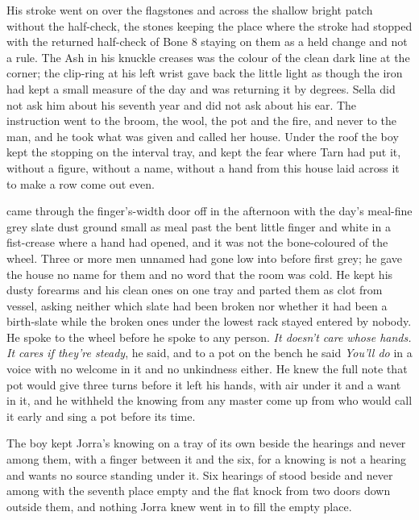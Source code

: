 His stroke went on over the flagstones and across the shallow bright patch without the half-check, the stones keeping the place where the stroke had stopped with the returned half-check of Bone 8 staying on them as a held change and not a rule. The Ash in his knuckle creases was the colour of the clean dark line at the corner; the clip-ring at his left wrist gave back the little light as though the iron had kept a small measure of the day and was returning it by degrees. Sella did not ask him about his seventh year and did not ask about his ear. The instruction went to the broom, the wool, the pot and the fire, and never to the man, and he took what was given and called her house. Under the roof the boy kept the stopping on the interval tray, and kept the fear where Tarn had put it, without a figure, without a name, without a hand from this house laid across it to make a row come out even.

\scenebreak

 came through the finger's-width door off  in the afternoon with the day's meal-fine grey slate dust ground small as meal past the bent little finger and white in a fist-crease where a hand had opened, and it was not the bone-coloured  of the wheel. Three or more men unnamed had gone low into  before first grey; he gave the house no name for them and no word that the room was cold. He kept his dusty forearms and his clean ones on one tray and parted them as clot from vessel, asking neither which slate had been broken nor whether it had been a birth-slate while the broken ones under the lowest rack stayed entered by nobody. He spoke to the wheel before he spoke to any person. \emph{It doesn't care whose hands. It cares if they're steady}, he said, and to a pot on the bench he said \emph{You'll do} in a voice with no welcome in it and no unkindness either. He knew the full note that pot would give three turns before it left his hands, with air under it and a want in it, and he withheld the knowing from any master come up from  who would call it early and sing a pot before its time.

The boy kept Jorra's knowing on a tray of its own beside the hearings and never among them, with a finger between it and the six, for a knowing is not a hearing and wants no source standing under it. Six hearings of  stood beside and never among with the seventh place empty and the flat knock from two doors down outside them, and nothing Jorra knew went in to fill the empty place.

